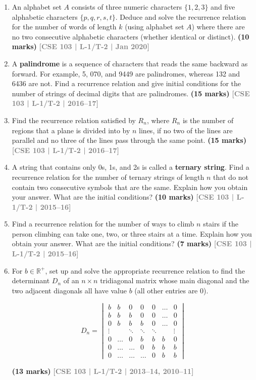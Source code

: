 \documentclass[12pt,a3paper]{article}
\newcommand{\yr}[1]{\hfill\textcolor{gray}{\small\textbf{[#1]}}}
\newcommand{\mk}[1]{\textcolor{orange!70!black}{\small\textbf{(#1 marks)}}}
\begin{document}
\begin{enumerate}
\item An alphabet set $A$ consists of three numeric characters $\{1, 2, 3\}$ and five alphabetic characters $\{p, q, r, s, t\}$. Deduce and solve the recurrence relation for the number of words of length $k$ (using alphabet set $A$) where there are no two consecutive alphabetic characters (whether identical or distinct).
\mk{10} \yr{CSE 103 | L-1/T-2 | Jan 2020}

\item A \textbf{palindrome} is a sequence of characters that reads the same backward as forward. For example, 5, 070, and 9449 are palindromes, whereas 132 and 6436 are not. Find a recurrence relation and give initial conditions for the number of strings of decimal digits that are palindromes.
\mk{15} \yr{CSE 103 | L-1/T-2 | 2016--17}

\item Find the recurrence relation satisfied by $R_n$, where $R_n$ is the number of regions that a plane is divided into by $n$ lines, if no two of the lines are parallel and no three of the lines pass through the same point.
\mk{15} \yr{CSE 103 | L-1/T-2 | 2016--17}

\item A string that contains only 0s, 1s, and 2s is called a \textbf{ternary string}. Find a recurrence relation for the number of ternary strings of length $n$ that do not contain two consecutive symbols that are the same. Explain how you obtain your answer. What are the initial conditions?
\mk{10} \yr{CSE 103 | L-1/T-2 | 2015--16}

\item Find a recurrence relation for the number of ways to climb $n$ stairs if the person climbing can take one, two, or three stairs at a time. Explain how you obtain your answer. What are the initial conditions?
\mk{7} \yr{CSE 103 | L-1/T-2 | 2015--16}

\item For $b \in \mathbb{R}^+$, set up and solve the appropriate recurrence relation to find the determinant $D_n$ of an $n \times n$ tridiagonal matrix whose main diagonal and the two adjacent diagonals all have value $b$ (all other entries are 0).
\begin{center}
  \[
  D_n = \begin{vmatrix}
  b & b & 0 & 0 & 0 & \dots & 0 \\
  b & b & b & 0 & 0 & \dots & 0 \\
  0 & b & b & b & 0 & \dots & 0 \\
  \vdots & & \ddots & \ddots & \ddots & & \vdots \\
  0 & \dots & 0 & b & b & b & 0 \\
  0 & \dots & \dots & 0 & b & b & b \\
  0 & \dots & \dots & \dots & 0 & b & b 
  \end{vmatrix}
  \]
\end{center}
\mk{13} \yr{CSE 103 | L-1/T-2 | 2013--14, 2010--11}   


\end{enumerate}
\end{document}
